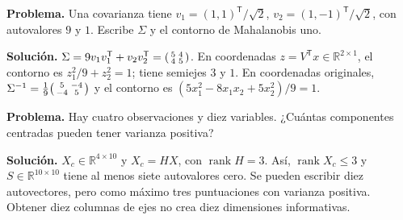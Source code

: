 \documentclass[11pt,a4paper]{article}
\newcommand{\R}{\mathbb R}
\newcommand{\T}{^{\mathsf T}}
\DeclareMathOperator{\rank}{rank}
\theoremstyle{definition}
\begin{document}
\begin{ejemplo}
\textbf{Problema.} Una covarianza tiene $v_1=(1,1)\T/\sqrt2$, $v_2=(1,-1)\T/\sqrt2$, con autovalores $9$ y $1$. Escribe $\Sigma$ y el contorno de Mahalanobis uno.

\textbf{Solución.} $\Sigma=9v_1v_1\T+v_2v_2\T=\begin{psmallmatrix}5&4\\4&5\end{psmallmatrix}$. En coordenadas $z=V\T x\in\R^{2\times1}$, el contorno es $z_1^2/9+z_2^2=1$; tiene semiejes $3$ y $1$. En coordenadas originales, $\Sigma^{-1}=\frac19\begin{psmallmatrix}5&-4\\-4&5\end{psmallmatrix}$ y el contorno es $(5x_1^2-8x_1x_2+5x_2^2)/9=1$.
\end{ejemplo}
\begin{ejemplo}
\textbf{Problema.} Hay cuatro observaciones y diez variables. ¿Cuántas componentes centradas pueden tener varianza positiva?

\textbf{Solución.} $X_c\in\R^{4\times10}$ y $X_c=HX$, con $\rank H=3$. Así, $\rank X_c\le3$ y $S\in\R^{10\times10}$ tiene al menos siete autovalores cero. Se pueden escribir diez autovectores, pero como máximo tres puntuaciones con varianza positiva. Obtener diez columnas de ejes no crea diez dimensiones informativas.
\end{ejemplo}
\end{document}
